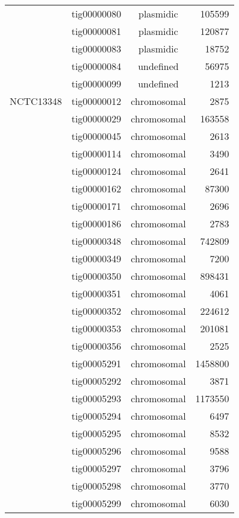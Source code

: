{\begin{supertabular}{llcr}
          & tig00000080 & plasmidic & 105599 \\
          & tig00000081 & plasmidic & 120877 \\
          & tig00000083 & plasmidic & 18752 \\
          & tig00000084 & undefined & 56975 \\
          & tig00000099 & undefined & 1213 \\
\hline \hline
NCTC13348 & tig00000012 & chromosomal & 2875 \\
          & tig00000029 & chromosomal & 163558 \\
          & tig00000045 & chromosomal & 2613 \\
          & tig00000114 & chromosomal & 3490 \\
          & tig00000124 & chromosomal & 2641 \\
          & tig00000162 & chromosomal & 87300 \\
          & tig00000171 & chromosomal & 2696 \\
          & tig00000186 & chromosomal & 2783 \\
          & tig00000348 & chromosomal & 742809 \\
          & tig00000349 & chromosomal & 7200 \\
          & tig00000350 & chromosomal & 898431 \\
          & tig00000351 & chromosomal & 4061 \\
          & tig00000352 & chromosomal & 224612 \\
          & tig00000353 & chromosomal & 201081 \\
          & tig00000356 & chromosomal & 2525 \\
          & tig00005291 & chromosomal & 1458800 \\
          & tig00005292 & chromosomal & 3871 \\
          & tig00005293 & chromosomal & 1173550 \\
          & tig00005294 & chromosomal & 6497 \\
          & tig00005295 & chromosomal & 8532 \\
          & tig00005296 & chromosomal & 9588 \\
          & tig00005297 & chromosomal & 3796 \\
          & tig00005298 & chromosomal & 3770 \\
          & tig00005299 & chromosomal & 6030 \\

\end{supertabular}}
